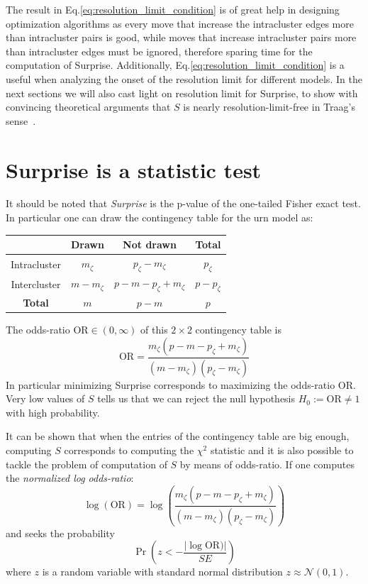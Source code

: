 The result in Eq.\ref{eq:resolution_limit_condition} is of great help in designing optimization algorithms as every move that increase the intracluster edges more than intracluster pairs is good, while moves that increase intracluster pairs more than intracluster edges must be ignored, therefore sparing time for the computation of Surprise. Additionally, Eq.\ref{eq:resolution_limit_condition} is a useful when analyzing the onset of the resolution limit for different models.
In the next sections we will also cast light on resolution limit for Surprise, to show with convincing theoretical arguments that $S$ is nearly resolution-limit-free in Traag's sense~\cite{traag2015}.

\section{Surprise is a statistic test}\label{sec:surprisefishertest}
It should be noted that \emph{Surprise} is the p-value of the one-tailed Fisher exact test. In particular one can draw the contingency table for the urn model as:

\begin{table}[htb]
\centering
\begin{tabular}{|c|c|c|c|}
\hline
 & Drawn & Not drawn & \textbf{Total}\\
\hline
Intracluster & $m_\zeta$ & $p_\zeta-m_\zeta$ & $p_\zeta$\\
\hline
Intercluster & $m-m_\zeta$ & $p-m-p_\zeta+m_\zeta$ & $p-p_\zeta$ \\
\hline
\textbf{Total} & $m$ & $p-m$ & $p$ \\
\hline
\end{tabular}
\end{table}
The odds-ratio $\textrm{OR} \in (0,\infty)$ of this $2\times 2$ contingency table is
\begin{equation}
\textrm{OR} = \frac{m_\zeta(p-m-p_\zeta+m_\zeta)}{(m-m_\zeta)(p_\zeta-m_\zeta)} 
\end{equation}
In particular minimizing Surprise corresponds to maximizing the odds-ratio $\textrm{OR}$. Very low values of $S$ tells us that we can reject the null hypothesis $H_0 := \textrm{OR} \neq 1$ with high probability.

It can be shown that when the entries of the contingency table are big enough, computing $S$ corresponds to computing the $\chi^2$ statistic and it is also possible to tackle the problem of computation of $S$ by means of odds-ratio.
If one computes the \emph{normalized log odds-ratio}:
\begin{equation}
\log(\textrm{OR}) = \log\left( \frac{m_\zeta(p-m-p_\zeta+m_\zeta)}{(m-m_\zeta)(p_\zeta-m_\zeta)} \right )
\end{equation}
and seeks the probability
\begin{equation}
\Pr\left(z < -\frac{|\log\textrm{OR})|}{SE} \right)
\end{equation}
where $z$ is a random variable with standard normal distribution $z \approx \mathcal{N}(0,1)$.



